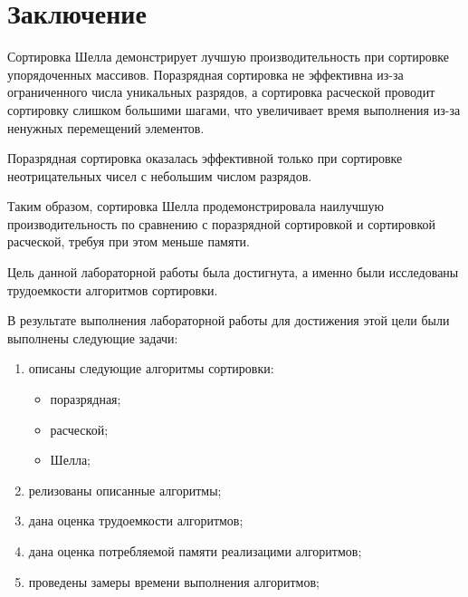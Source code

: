\chapter*{Заключение}

Сортировка Шелла демонстрирует лучшую производительность при сортировке упорядоченных массивов. 
Поразрядная сортировка не эффективна из-за ограниченного числа уникальных разрядов, а сортировка расческой проводит сортировку слишком большими шагами, что увеличивает время выполнения из-за ненужных перемещений элементов. 

Поразрядная сортировка оказалась эффективной только при сортировке неотрицательных чисел с небольшим числом разрядов. 

Таким образом, сортировка Шелла продемонстрировала наилучшую производительность по сравнению с поразрядной сортировкой и сортировкой расческой, требуя при этом меньше памяти.

Цель данной лабораторной работы была достигнута, а именно были исследованы трудоемкости алгоритмов сортировки.

В результате выполнения лабораторной работы для достижения этой цели были выполнены следующие задачи:
\begin{enumerate}
    \item описаны следующие алгоритмы сортировки:
        \begin{itemize}
            \item поразрядная;
            \item расческой;
            \item Шелла;
        \end{itemize}
    \item релизованы описанные алгоритмы;
    \item дана оценка трудоемкости алгоритмов;
    \item дана оценка потребляемой памяти реализацими алгоритмов;
    \item проведены замеры времени выполнения алгоритмов;
\end{enumerate}

